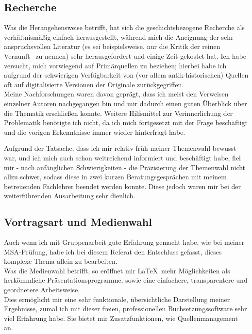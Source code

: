 \documentclass[12pt,a4paper,final]{article}
\begin{document}
\subsection*{Recherche}
Was die Herangehensweise betrifft, hat sich die geschichtsbezogene Recherche als verhältnismäßig einfach herausgestellt, während mich die Aneignung der sehr anspruchsvollen Literatur (es sei beispielsweise. nur die \glqq Kritik der reinen Vernunft\grqq\ \cite{kritik}
 zu nennen) sehr herausgefordert und einige Zeit gekostet hat. Ich habe versucht, mich vorwiegend auf Primärquellen zu beziehen; hierbei habe ich aufgrund der schwierigen Verfügbarkeit von (vor allem antik-historischen) Quellen oft auf digitalisierte Versionen der Originale zurückgegriffen.\\
Meine Nachforschungen waren davon geprägt, dass ich meist den Verweisen einzelner Autoren nachgegangen bin und mir dadurch einen guten Überblick über die Thematik erschließen konnte. Weitere Hilfsmittel zur Verinnerlichung der Problematik benötigte ich nicht, da ich mich fortgesetzt mit der Frage beschäftigt und die vorigen Erkenntnisse immer wieder hinterfragt habe.

Aufgrund der Tatsache, dass ich mir relativ früh meiner Themenwahl bewusst war, und ich mich auch schon weitreichend informiert und beschäftigt habe, fiel mir - nach anfänglichen Schwierigkeiten - die Präzisierung der Themenwahl nicht allzu schwer, sodass diese in zwei kurzen Beratungsgesprächen mit meinem betreuenden Fachlehrer beendet werden konnte. Diese jedoch waren mir bei der weiterführenden Ausarbeitung sehr dienlich.
%
\subsection*{Vortragsart und Medienwahl}
Auch wenn ich mit Gruppenarbeit gute Erfahrung gemacht habe, wie bei meiner MSA-Prüfung, 
habe ich bei diesem Referat den Entschluss gefasst, dieses komplexe Thema allein zu bearbeiten.\\
Was die Medienwahl betrifft, so eröffnet mir \LaTeX\ mehr Möglichkeiten als herkömmliche Präsentationsprogramme, sowie eine einfachere, transparentere und geordnetere Arbeitsweise.\\
Dies ermöglicht mir eine sehr funktionale, übersichtliche Darstellung meiner Ergebnisse, zumal ich mit dieser freien, professionellen Buchsetzungssoftware sehr viel Erfahrung habe. Sie bietet mir Zusatzfunktionen, wie Quellenmanagement an.
%
\end{document}
